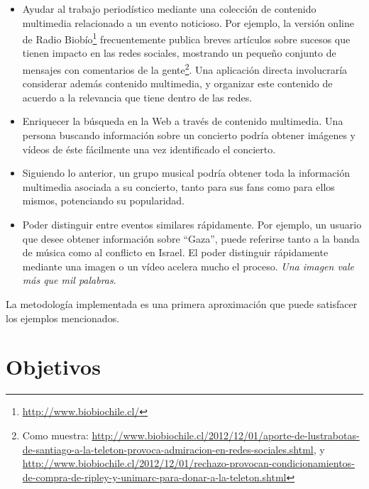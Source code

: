 \begin{itemize}
\item Ayudar al trabajo periodístico mediante una colección de
     contenido multimedia relacionado a un evento noticioso. Por
     ejemplo, la versión online de Radio
     Biobío\footnote{\href{http://www.biobiochile.cl/}{http://www.biobiochile.cl/} } frecuentemente publica
     breves artículos sobre sucesos que tienen impacto en las redes
     sociales, mostrando un pequeño conjunto de mensajes con
     comentarios de la gente\footnote{Como muestra: \href{http://www.biobiochile.cl/2012/12/01/aporte-de-lustrabotas-de-santiago-a-la-teleton-provoca-admiracion-en-redes-sociales.shtml}{http://www.biobiochile.cl/2012/12/01/aporte-de-lustrabotas-de-santiago-a-la-teleton-provoca-admiracion-en-redes-sociales.shtml}, y \href{http://www.biobiochile.cl/2012/12/01/rechazo-provocan-condicionamientos-de-compra-de-ripley-y-unimarc-para-donar-a-la-teleton.shtml}{http://www.biobiochile.cl/2012/12/01/rechazo-provocan-condicionamientos-de-compra-de-ripley-y-unimarc-para-donar-a-la-teleton.shtml} }.
     Una aplicación directa involucraría
     considerar además contenido multimedia, y organizar este
     contenido de acuerdo a la relevancia que tiene dentro de las
     redes.
\item Enriquecer la búsqueda en la Web a través de contenido
     multimedia. Una persona buscando información sobre un concierto
     podría obtener imágenes y vídeos de éste fácilmente una vez
     identificado el concierto.
\item Siguiendo lo anterior, un grupo musical podría obtener toda la
     información multimedia asociada a su concierto, tanto para sus
     fans como para ellos mismos, potenciando su popularidad.
\item Poder distinguir entre eventos similares rápidamente. Por
     ejemplo, un usuario que desee obtener información sobre ``Gaza'',
     puede referirse tanto a la banda de música como al conflicto en
     Israel. El poder distinguir rápidamente mediante una imagen o un
     vídeo acelera mucho el proceso. \emph{Una imagen vale más que mil palabras}.
\end{itemize}
   La metodología implementada es una primera aproximación que puede
   satisfacer los ejemplos mencionados.

\section{Objetivos}
\label{sec-1.2}

